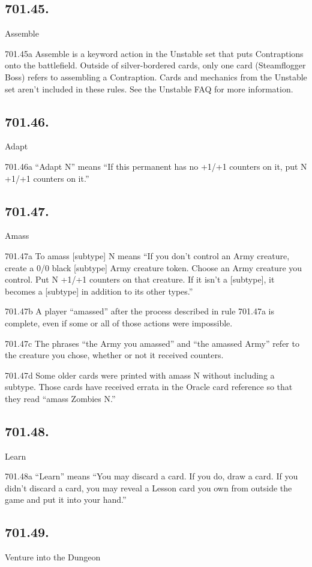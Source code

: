 \subsection*{701.45.}
Assemble

701.45a Assemble is a keyword action in the Unstable set that puts Contraptions onto the battlefield. Outside of silver-bordered cards, only one card (Steamflogger Boss) refers to assembling a Contraption. Cards and mechanics from the Unstable set aren’t included in these rules. See the Unstable FAQ for more information.

\subsection*{701.46.}
Adapt

701.46a “Adapt N” means “If this permanent has no +1/+1 counters on it, put N +1/+1 counters on it.”

\subsection*{701.47.}
Amass

701.47a To amass [subtype] N means “If you don’t control an Army creature, create a 0/0 black [subtype] Army creature token. Choose an Army creature you control. Put N +1/+1 counters on that creature. If it isn’t a [subtype], it becomes a [subtype] in addition to its other types.”

701.47b A player “amassed” after the process described in rule 701.47a is complete, even if some or all of those actions were impossible.

701.47c The phrases “the Army you amassed” and “the amassed Army” refer to the creature you chose, whether or not it received counters.

701.47d Some older cards were printed with amass N without including a subtype. Those cards have received errata in the Oracle card reference so that they read “amass Zombies N.”

\subsection*{701.48.}
Learn

701.48a “Learn” means “You may discard a card. If you do, draw a card. If you didn’t discard a card, you may reveal a Lesson card you own from outside the game and put it into your hand.”

\subsection*{701.49.}
Venture into the Dungeon

